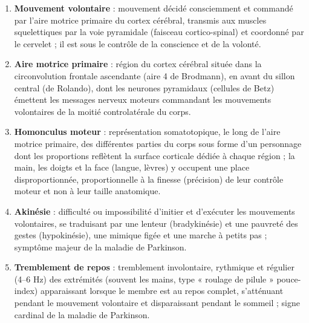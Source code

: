 \documentclass[11pt]{article}
\begin{document}
\begin{corrige}
\begin{enumerate}
\item \textbf{Mouvement volontaire} : mouvement décidé consciemment et commandé par l'aire motrice primaire du cortex cérébral, transmis aux muscles squelettiques par la voie pyramidale (faisceau cortico-spinal) et coordonné par le cervelet ; il est sous le contrôle de la conscience et de la volonté.
\item \textbf{Aire motrice primaire} : région du cortex cérébral située dans la circonvolution frontale ascendante (aire 4 de Brodmann), en avant du sillon central (de Rolando), dont les neurones pyramidaux (cellules de Betz) émettent les messages nerveux moteurs commandant les mouvements volontaires de la moitié controlatérale du corps.
\item \textbf{Homonculus moteur} : représentation somatotopique, le long de l'aire motrice primaire, des différentes parties du corps sous forme d'un personnage dont les proportions reflètent la surface corticale dédiée à chaque région ; la main, les doigts et la face (langue, lèvres) y occupent une place disproportionnée, proportionnelle à la finesse (précision) de leur contrôle moteur et non à leur taille anatomique.
\item \textbf{Akinésie} : difficulté ou impossibilité d'initier et d'exécuter les mouvements volontaires, se traduisant par une lenteur (bradykinésie) et une pauvreté des gestes (hypokinésie), une mimique figée et une marche à petits pas ; symptôme majeur de la maladie de Parkinson.
\item \textbf{Tremblement de repos} : tremblement involontaire, rythmique et régulier (4--6 Hz) des extrémités (souvent les mains, type « roulage de pilule » pouce-index) apparaissant lorsque le membre est au repos complet, s'atténuant pendant le mouvement volontaire et disparaissant pendant le sommeil ; signe cardinal de la maladie de Parkinson.
\end{enumerate}
\end{corrige}
\end{document}
